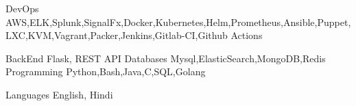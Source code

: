 

\begin{cvskills}

  \cvskill
    {DevOps} %
	{AWS,ELK,Splunk,SignalFx,Docker,Kubernetes,Helm,Prometheus,Ansible,Puppet,LXC,KVM,Vagrant,Packer,Jenkins,Gitlab-CI,Github Actions} %

  \cvskill
   {BackEnd} %
	{Flask, REST API} %
  \cvskill
   {Databases} %
	{Mysql,ElasticSearch,MongoDB,Redis} %
  \cvskill
   {Programming} %
	{Python,Bash,Java,C,SQL,Golang} %

  \cvskill
    {Languages} %
	{English, Hindi} %

\end{cvskills}
